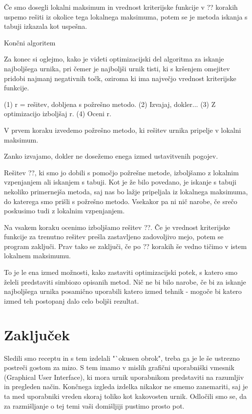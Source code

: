 \documentclass[a4paper,10pt]{article}
\begin{document}
Če smo dosegli lokalni maksimum in vrednost kriterijske funkcije v ?? korakih uspemo
rešiti iz okolice tega lokalnega maksimuma, potem se je metoda iskanja s tabuji izkazala
kot uspešna.

Končni algoritem %

Za konec si oglejmo, kako je videti optimizacijski del algoritma za iskanje najboljšega
urnika, pri čemer je najboljši urnik tisti, ki s kršenjem omejitev pridobi najmanj negativnih
točk, oziroma ki ima največjo vrednost kriterijske funkcije.

(1) r = rešitev, dobljena s požrešno metodo.
(2) Izvajaj, dokler...
{
   (3) Z optimizacijo izboljšaj r.
   (4) Oceni r.
}

   V prvem koraku izvedemo požrešno metodo, ki rešitev urnika pripelje v lokalni maksimum.

   Zanko izvajamo, dokler ne dosežemo enega izmed ustavitvenih pogojev.

   Rešitev ??, ki smo jo dobili s pomočjo požrešne metode, izboljšamo z lokalnim vzpenjanjem
   ali iskanjem s tabuji. Kot je že bilo povedano, je iskanje s tabuji nekoliko primernejša metoda,
   saj nas bo lažje pripeljala iz lokalnega maksimuma, do katerega smo prišli s požrešno metodo.
   Vsekakor pa ni nič narobe, če srečo poskusimo tudi z lokalnim vzpenjanjem.

   Na vsakem koraku ocenimo izboljšamo rešitev ??. Če je vrednost kriterijske funkcije
   za trenutno rešitev prešla zastavljeno zadovoljivo mejo, potem se program zaključi. Prav tako
   se zaključi, če po ?? korakih še vedno tičimo v istem lokalnem maksimumu.

To je le ena izmed možnosti, kako zastaviti optimizacijski potek, s katero smo želeli predstaviti
simbiozo opisanih metod. Nič ne bi bilo narobe, če bi za iskanje najboljšega urnika posamično
uporabili katero izmed tehnik - mogoče bi katero izmed teh postopanj dalo celo boljši rezultat.

\section{Zaključek}

Sledili smo receptu in s tem izdelali "`okusen obrok", treba ga je le še ustrezno postreči
gostom za mizo. S tem imamo v mislih grafični uporabniški vmesnik (Graphical
User Interface), ki mora urnik uporabnikom predstaviti na razumljiv in
pregleden način. Končnega izgleda izdelka nikakor ne smemo zanemariti, saj je ta med uporabniki
vreden skoraj toliko kot kakovosten urnik. Odločili smo se, da za razmišljanje o tej temi vaši
domišljiji pustimo prosto pot.
\end{document}
